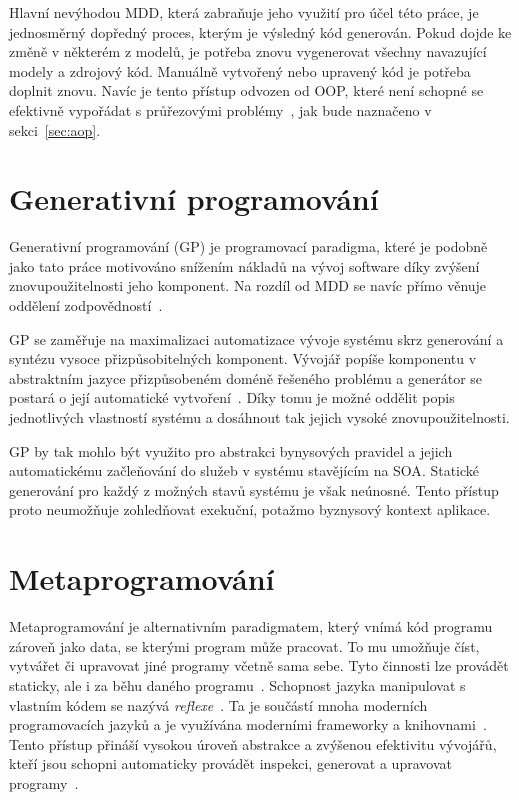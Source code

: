 Hlavní nevýhodou \gls{MDD}, která zabraňuje jeho využití pro účel této práce,
je jednosměrný dopředný proces, kterým je výsledný kód generován. Pokud dojde ke změně v
některém z modelů, je potřeba znovu vygenerovat všechny navazující modely a zdrojový kód.
Manuálně vytvořený nebo upravený kód je potřeba doplnit znovu. Navíc je tento přístup odvozen od
\gls{OOP}, které není schopné se efektivně vypořádat s průřezovými problémy~\cite{cemus2014aspect,
kennard2009separation}, jak bude naznačeno v sekci~\ref{sec:aop}.

\section{Generativní programování}

Generativní programování (\gls{GP}) je programovací paradigma, které je podobně jako
tato práce motivováno snížením nákladů na vývoj software díky zvýšení znovupoužitelnosti
jeho komponent. Na rozdíl od \gls{MDD} se navíc přímo věnuje oddělení
zodpovědností~\cite{cemus2017separation, czarnecki2000generative}.

\gls{GP} se zaměřuje na maximalizaci automatizace vývoje systému
skrz generování a syntézu vysoce přizpůsobitelných komponent. Vývojář
popíše komponentu v abstraktním jazyce přizpůsobeném doméně řešeného
problému a generátor se postará o její automatické vytvoření~\cite{czarnecki2000generative}.
Díky tomu je možné oddělit popis jednotlivých vlastností systému a dosáhnout tak
jejich vysoké znovupoužitelnosti.

\gls{GP} by tak mohlo být využito pro abstrakci bynysových pravidel a jejich
automatickému začleňování do služeb v systému stavějícím na \gls{SOA}.
Statické generování pro každý z možných stavů systému je však neúnosné. Tento
přístup proto neumožňuje zohledňovat exekuční, potažmo byznysový kontext aplikace.

\section{Metaprogramování}\label{sec:metaprogramming}

Metaprogramování je alternativním paradigmatem, který vnímá kód programu
zároveň jako data, se kterými program může pracovat. To mu umožňuje
číst, vytvářet či upravovat jiné programy včetně sama sebe. Tyto činnosti
lze provádět staticky, ale i za běhu daného programu~\cite{czarnecki2000generative, sheard2001accomplishments}.
Schopnost jazyka manipulovat s vlastním kódem se nazývá \textit{reflexe}~\cite{sobel1996introduction}.
Ta je součástí mnoha moderních programovacích jazyků a je využívána moderními frameworky a
knihovnami~\cite{forman2004java, vandevoorde2002c++}.
Tento přístup přináší vysokou úroveň abstrakce a zvýšenou efektivitu
vývojářů, kteří jsou schopni automaticky provádět inspekci, generovat a upravovat
programy~\cite{sheard2001accomplishments}.

